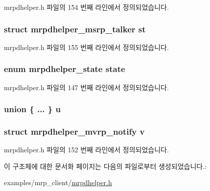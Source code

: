 mrpdhelper.\+h 파일의 154 번째 라인에서 정의되었습니다.

\subsubsection[{\texorpdfstring{st}{st}}]{\setlength{\rightskip}{0pt plus 5cm}struct {\bf mrpdhelper\+\_\+msrp\+\_\+talker} st}\hypertarget{structmrpdhelper__notify_a209998708bfd4abd147e5baf834dfb1d}{}\label{structmrpdhelper__notify_a209998708bfd4abd147e5baf834dfb1d}


mrpdhelper.\+h 파일의 155 번째 라인에서 정의되었습니다.

\subsubsection[{\texorpdfstring{state}{state}}]{\setlength{\rightskip}{0pt plus 5cm}enum {\bf mrpdhelper\+\_\+state} state}\hypertarget{structmrpdhelper__notify_ab6df4baa55ddd38e0c9a7dba60b483a9}{}\label{structmrpdhelper__notify_ab6df4baa55ddd38e0c9a7dba60b483a9}


mrpdhelper.\+h 파일의 147 번째 라인에서 정의되었습니다.

\subsubsection[{\texorpdfstring{u}{u}}]{\setlength{\rightskip}{0pt plus 5cm}union \{ ... \}   u}\hypertarget{structmrpdhelper__notify_aed8d5758c73f0f41798e9f733639b060}{}\label{structmrpdhelper__notify_aed8d5758c73f0f41798e9f733639b060}
\subsubsection[{\texorpdfstring{v}{v}}]{\setlength{\rightskip}{0pt plus 5cm}struct {\bf mrpdhelper\+\_\+mvrp\+\_\+notify} v}\hypertarget{structmrpdhelper__notify_a30cbacfa205024f30ed4c9faf8159e9d}{}\label{structmrpdhelper__notify_a30cbacfa205024f30ed4c9faf8159e9d}


mrpdhelper.\+h 파일의 152 번째 라인에서 정의되었습니다.



이 구조체에 대한 문서화 페이지는 다음의 파일로부터 생성되었습니다.\+:\begin{DoxyCompactItemize}
\item 
examples/mrp\+\_\+client/\hyperlink{mrpdhelper_8h}{mrpdhelper.\+h}\end{DoxyCompactItemize}
